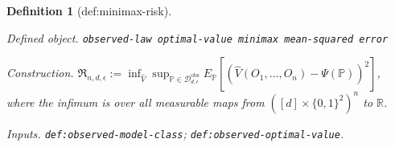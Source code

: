 \documentclass{article}
\newtheorem{definition}{Definition}
\begin{document}
\begin{definition}[def:minimax-risk]\label{def:minimax-risk}
\par\smallskip\noindent\emph{Defined object.} \texttt{observed-\allowbreak{}law optimal-\allowbreak{}value minimax mean-\allowbreak{}squared error}
\par\smallskip\noindent\emph{Construction.} \(\mathfrak R_{n,d,\epsilon}:=\inf_{\widehat V}\sup_{\mathbb P\in\mathcal D_{d,\epsilon}^{\mathrm{obs}}}E_{\mathbb P}[(\widehat V(O_1,\ldots,O_n)-\Psi(\mathbb P))^2]\), where the infimum is over all measurable maps from \(([d]\times\{0,1\}^2)^n\) to \(\mathbb R\).
\par\smallskip\noindent\emph{Inputs.} \texttt{def:\allowbreak{}observed-\allowbreak{}model-\allowbreak{}class}; \texttt{def:\allowbreak{}observed-\allowbreak{}optimal-\allowbreak{}value}.
\end{definition}
\end{document}

